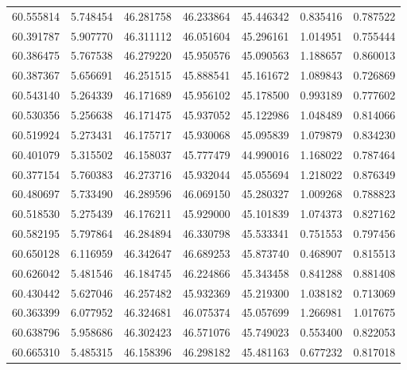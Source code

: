 \begin{tabular}{rrrrrrr}
 60.555814 &   5.748454 &         46.281758 &         46.233864 &         45.446342 &  0.835416 &  0.787522 \\
 60.391787 &   5.907770 &         46.311112 &         46.051604 &         45.296161 &  1.014951 &  0.755444 \\
 60.386475 &   5.767538 &         46.279220 &         45.950576 &         45.090563 &  1.188657 &  0.860013 \\
 60.387367 &   5.656691 &         46.251515 &         45.888541 &         45.161672 &  1.089843 &  0.726869 \\
 60.543140 &   5.264339 &         46.171689 &         45.956102 &         45.178500 &  0.993189 &  0.777602 \\
 60.530356 &   5.256638 &         46.171475 &         45.937052 &         45.122986 &  1.048489 &  0.814066 \\
 60.519924 &   5.273431 &         46.175717 &         45.930068 &         45.095839 &  1.079879 &  0.834230 \\
 60.401079 &   5.315502 &         46.158037 &         45.777479 &         44.990016 &  1.168022 &  0.787464 \\
 60.377154 &   5.760383 &         46.273716 &         45.932044 &         45.055694 &  1.218022 &  0.876349 \\
 60.480697 &   5.733490 &         46.289596 &         46.069150 &         45.280327 &  1.009268 &  0.788823 \\
 60.518530 &   5.275439 &         46.176211 &         45.929000 &         45.101839 &  1.074373 &  0.827162 \\
 60.582195 &   5.797864 &         46.284894 &         46.330798 &         45.533341 &  0.751553 &  0.797456 \\
 60.650128 &   6.116959 &         46.342647 &         46.689253 &         45.873740 &  0.468907 &  0.815513 \\
 60.626042 &   5.481546 &         46.184745 &         46.224866 &         45.343458 &  0.841288 &  0.881408 \\
 60.430442 &   5.627046 &         46.257482 &         45.932369 &         45.219300 &  1.038182 &  0.713069 \\
 60.363399 &   6.077952 &         46.324681 &         46.075374 &         45.057699 &  1.266981 &  1.017675 \\
 60.638796 &   5.958686 &         46.302423 &         46.571076 &         45.749023 &  0.553400 &  0.822053 \\
 60.665310 &   5.485315 &         46.158396 &         46.298182 &         45.481163 &  0.677232 &  0.817018 \\

\end{tabular}
